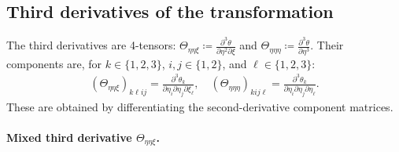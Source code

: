 \documentclass{article}
\begin{document}
\subsection{Third derivatives of the transformation}

The third derivatives are 4-tensors: $\Theta_{\eta\eta\xi} \coloneqq \frac{\partial^3 \theta}{\partial \eta^2 \partial \xi}$ and $\Theta_{\eta\eta\eta} \coloneqq \frac{\partial^3 \theta}{\partial \eta^3}$.
Their components are, for $k \in \{1,2,3\}$, $i,j \in \{1,2\}$, and $\ell \in \{1,2,3\}$:
%
\begin{align}
  (\Theta_{\eta\eta\xi})_{k\ell ij} = \frac{\partial^3 \theta_k}{\partial \eta_i \partial \eta_j \partial \xi_\ell}, \quad (\Theta_{\eta\eta\eta})_{kij\ell} = \frac{\partial^3 \theta_k}{\partial \eta_i \partial \eta_j \partial \eta_\ell}.
\end{align}
%
These are obtained by differentiating the second-derivative component matrices.

\paragraph{Mixed third derivative $\Theta_{\eta\eta\xi}$.}
\end{document}
